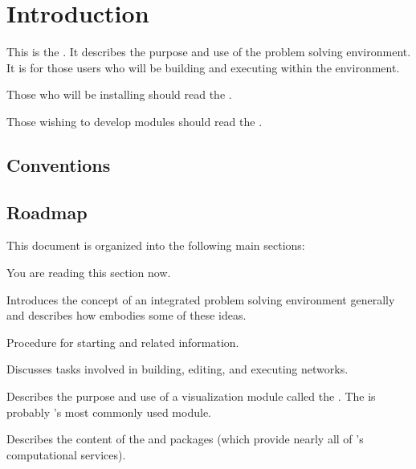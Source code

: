 %

\section{Introduction}
\label{sec:intro}

This is the \etitle{\srug}.  It describes the purpose and use of the \pse{}
problem solving environment.  It is for those users who will be building
and executing  within the \pse{} environment.

Those who will be installing \pse{} should read the \etitle{\srig}.

Those wishing to develop modules should read the \etitle{\srdg}.


\subsection{Conventions}
\label{sec:conventions}


\subsection{Roadmap}
\label{sec:roadmap}

This document is organized into the following main sections:

\begin{description}
  \item {} You are reading this section now.
  \item {} Introduces the concept of an
        integrated problem solving environment generally and describes how
        \PSE{} embodies some of these ideas.
  \item {}  Procedure for starting \pse{}
        and related information.
  \item {} Discusses tasks
        involved in building, editing, and executing networks.
  \item {} Describes the
        purpose and use of a visualization module called the \viewer{}.
        The \viewer{} is probably \pse{}'s most commonly used module.
  \item {}  Describes the content of the \sr{}
        and \pse{} packages (which provide nearly all of \pse{}'s
        computational services).
\end{description}

